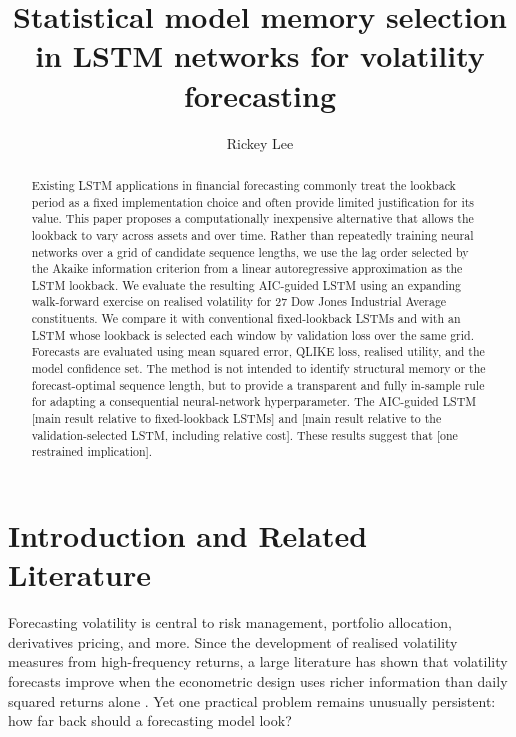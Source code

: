 \documentclass[12pt]{article}
\begin{document}
\title{\Large\textbf{Statistical model memory selection in LSTM networks for volatility forecasting}}
\author[]{Rickey Lee}
\date{}

\renewcommand\Authfont{\normalsize}
\renewcommand\Affilfont{\small}

\maketitle
\doublespacing

\begin{abstract}
Existing LSTM applications in financial forecasting commonly treat the lookback period as a fixed implementation choice and often provide limited justification for its value. This paper proposes a computationally inexpensive alternative that allows the lookback to vary across assets and over time. Rather than repeatedly training neural networks over a grid of candidate sequence lengths, we use the lag order selected by the Akaike information criterion from a linear autoregressive approximation as the LSTM lookback. We evaluate the resulting AIC-guided LSTM using an expanding walk-forward exercise on realised volatility for 27 Dow Jones Industrial Average constituents. We compare it with conventional fixed-lookback LSTMs and with an LSTM whose lookback is selected each window by validation loss over the same grid. Forecasts are evaluated using mean squared error, QLIKE loss, realised utility, and the model confidence set. The method is not intended to identify structural memory or the forecast-optimal sequence length, but to provide a transparent and fully in-sample rule for adapting a consequential neural-network hyperparameter. The AIC-guided LSTM [main result relative to fixed-lookback LSTMs] and [main result relative to the validation-selected LSTM, including relative cost]. These results suggest that [one restrained implication].
\end{abstract}

\section{Introduction and Related Literature}

\noindent Forecasting volatility is central to risk management, portfolio allocation, derivatives pricing, and more. Since the development of realised volatility measures from high-frequency returns, a large literature has shown that volatility forecasts improve when the econometric design uses richer information than daily squared returns alone \parencite{andersen-1998,andersen-2003}. Yet one practical problem remains unusually persistent: how far back should a forecasting model look?
\end{document}
